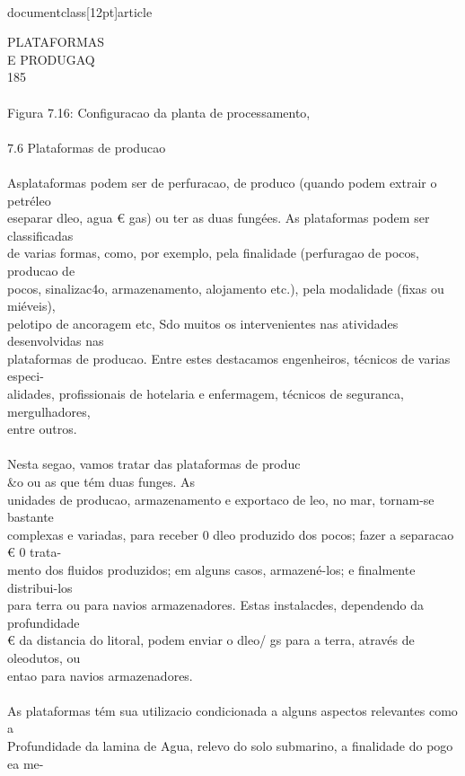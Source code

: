 \\documentclass[12pt]{article}
\begin{document}
PLATAFORMAS\\
E PRODUGAQ\\
185\\
\\
Figura 7.16: Configuracao da planta de processamento,\\
\\
7.6 Plataformas de producao\\
\\
Asplataformas podem ser de perfuracao, de produco (quando podem extrair o petréleo\\
eseparar dleo, agua € gas) ou ter as duas fungées. As plataformas podem ser classificadas\\
de varias formas, como, por exemplo, pela finalidade (perfuragao de pocos, producao de\\
pocos, sinalizac4o, armazenamento, alojamento etc.), pela modalidade (fixas ou miéveis),\\
pelotipo de ancoragem etc, Sdo muitos os intervenientes nas atividades desenvolvidas nas\\
plataformas de producao. Entre estes destacamos engenheiros, técnicos de varias especi-\\
alidades, profissionais de hotelaria e enfermagem, técnicos de seguranca, mergulhadores,\\
entre outros.\\
\\
Nesta segao, vamos tratar das plataformas de produc\\&o ou as que tém duas funges. As\\
unidades de producao, armazenamento e exportaco de leo, no mar, tornam-se bastante\\
complexas e variadas, para receber 0 dleo produzido dos pocos; fazer a separacao € 0 trata-\\
mento dos fluidos produzidos; em alguns casos, armazené-los; e finalmente distribui-los\\
para terra ou para navios armazenadores. Estas instalacdes, dependendo da profundidade\\
€ da distancia do litoral, podem enviar o dleo/ gs para a terra, através de oleodutos, ou\\
entao para navios armazenadores.\\
\\
As plataformas tém sua utilizacio condicionada a alguns aspectos relevantes como a\\
Profundidade da lamina de Agua, relevo do solo submarino, a finalidade do pogo ea me-\\
\end{document}
